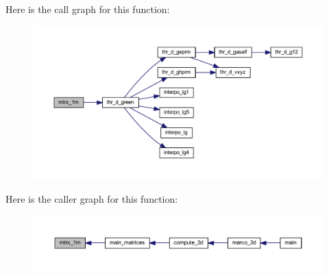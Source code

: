 Here is the call graph for this function\+:
\nopagebreak
\begin{figure}[H]
\begin{center}
\leavevmode
\includegraphics[width=350pt]{Marco_8f90_a3b9b07c27baabf42e767b59314d43d09_cgraph}
\end{center}
\end{figure}
Here is the caller graph for this function\+:
\nopagebreak
\begin{figure}[H]
\begin{center}
\leavevmode
\includegraphics[width=350pt]{Marco_8f90_a3b9b07c27baabf42e767b59314d43d09_icgraph}
\end{center}
\end{figure}
\mbox{\label{Marco_8f90_a03907a5d9862c74e1506120651d1848a}} 
